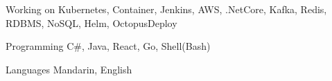 

\begin{cvskills}

  \cvskill
    {Working on} %
    {Kubernetes, Container, Jenkins, AWS, .NetCore, Kafka, Redis, RDBMS, NoSQL, Helm, OctopusDeploy} %

  \cvskill
    {Programming} %
    {C\#, Java, React, Go, Shell(Bash)} %

  \cvskill
    {Languages} %
    {Mandarin, English} %

\end{cvskills}
